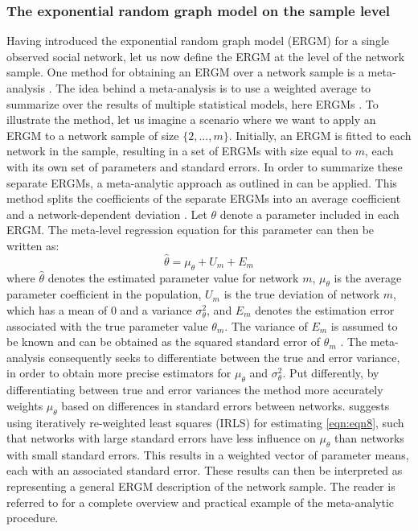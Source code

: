 \documentclass[a4paper, man, floatsintext]{apa6}
\begin{document}
\subsubsection{The exponential random graph model on the sample level}
Having introduced the exponential random graph model (ERGM) for a single observed social network, let us now define the ERGM at the level of the network sample. One method for obtaining an ERGM over a network sample is a meta-analysis \cite{lubbers2003group}. The idea behind a meta-analysis is to use a weighted average to summarize over the results of multiple statistical models, here ERGMs \cite{lubbers2003group}. To illustrate the method, let us imagine a scenario where we want to apply an ERGM to a network sample of size $\{2, ..., m\}$. \clearpage \noindent Initially, an ERGM is fitted to each network in the sample, resulting in a set of ERGMs with size equal to $m$, each with its own set of parameters and standard errors. In order to summarize these separate ERGMs, a meta-analytic approach as outlined in  can be applied. This method splits the coefficients of the separate ERGMs into an average coefficient and a network-dependent deviation \cite{lubbers2003group}. Let $\theta$ denote a parameter included in each ERGM. The meta-level regression equation for this parameter can then be written as: \begin{equation} \label{eqn:eqn8} \hat{\theta} = \mu_{\theta} + U_{m} + E_{m} \end{equation} where $\hat{\theta}$ denotes the estimated parameter value for network $m$, $\mu_{\theta}$ is the average parameter coefficient in the population, $U_{m}$ is the true deviation of network $m$, which has a mean of 0 and a variance $\sigma^{2}_{\theta}$, and $E_{m}$ denotes the estimation error associated with the true parameter value $\theta_{m}$. The variance of $E_{m}$ is assumed to be known and can be obtained as the squared standard error of $\theta_{m}$ \cite{lubbers2003group}. The meta-analysis consequently seeks to differentiate between the true and error variance, in order to obtain more precise estimators for $\mu_{\theta}$ and $\sigma^{2}_{\theta}$. Put differently, by differentiating between true and error variances the method more accurately weights $\mu_{\theta}$ based on differences in standard errors between networks.  suggests using iteratively re-weighted least squares (IRLS) for estimating \eqref{eqn:eqn8}, such that networks with large standard errors have less influence on $\mu_{\theta}$ than networks with small standard errors. This results in a weighted vector of parameter means, each with an associated standard error. These results can then be interpreted as representing a general ERGM description of the network sample. The reader is referred to  for a complete overview and practical example of the meta-analytic procedure.
\\
\end{document}
